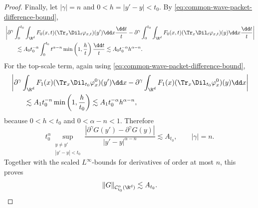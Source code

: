 \begin{proof}
Finally, let \(|\gamma|=n\) and \(0<h=|y'-y|<t_0\).
By \eqref{eq:common-wave-packet-difference-bound},
\[
\begin{aligned}
& \left| \partial^\gamma \int_0^{t_0}\int_{\R^d} F_0(x,t) (\Tr_x\Dil_t\varphi_{x,t})(y') \dd x\frac{\dd t}{t}
- \partial^\gamma \int_0^{t_0}\int_{\R^d} F_0(x,t) (\Tr_x\Dil_t\varphi_{x,t})(y) \dd x\frac{\dd t}{t} \right|
\\
& \qquad\lesssim A_0t_0^{-\alpha} \int_0^{t_0} t^{\alpha-n} \min\left(1,\frac{h}{t}\right) \frac{\dd t}{t}
\lesssim A_0t_0^{-\alpha}h^{\alpha-n}.
\end{aligned}
\]
For the top-scale term, again using \eqref{eq:common-wave-packet-difference-bound},
\[
\begin{aligned}
& \left| \partial^\gamma \int_{\R^d} F_1(x) (\Tr_x\Dil_{t_0}\varphi^0_x)(y') \dd x - \partial^\gamma \int_{\R^d} F_1(x) (\Tr_x\Dil_{t_0}\varphi^0_x)(y) \dd x \right|
\\
& \qquad\lesssim A_1t_0^{-n} \min\left(1,\frac{h}{t_0}\right) \lesssim A_1t_0^{-\alpha}h^{\alpha-n},
\end{aligned}
\]
because \(0<h<t_0\) and \(0<\alpha-n<1\).
Therefore
\[
t_0^\alpha \sup_{\substack{y\ne y'\\ |y'-y|<t_0}} \frac{ |\partial^\gamma G(y')-\partial^\gamma G(y)| }{|y'-y|^{\alpha-n} }
\lesssim A_{t_0}, \qquad |\gamma|=n.
\]
Together with the scaled \(L^\infty\)-bounds for derivatives of order at most \(n\), this proves
\[
\|G\|_{\mathcal{C}^{\alpha}_{t_0}(\R^d)} \lesssim A_{t_0}.
\]
\end{proof}
